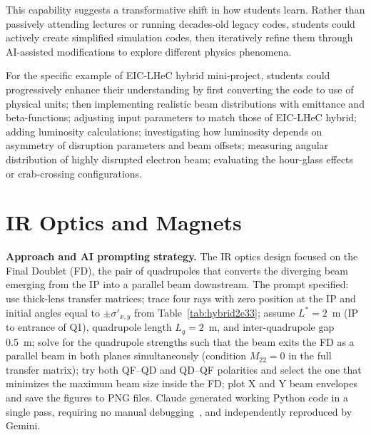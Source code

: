 \documentclass[%
               refpage,       %
               biblatex,     %
               hyphens,      %
               ]{jacow}
\begin{document}
This capability suggests a transformative shift in how students learn. Rather than passively attending lectures or running decades-old legacy codes, students could actively create simplified simulation codes, then iteratively refine them through AI-assisted modifications to explore different physics phenomena.

For the specific example of EIC-LHeC hybrid mini-project, students could progressively enhance their understanding by first converting the code to use of physical units; then implementing realistic beam distributions with emittance and beta-functions; adjusting input parameters to match those of EIC-LHeC hybrid; adding luminosity calculations; investigating how luminosity depends on asymmetry of disruption parameters and beam offsets; measuring angular distribution of highly disrupted electron beam; evaluating the hour-glass effects or crab-crossing configurations. 

\section{IR Optics and Magnets}                                                
   
  \textbf{Approach and AI prompting strategy.}                                   
  The IR optics design focused on the Final Doublet (FD), the pair of
  quadrupoles that converts the diverging beam emerging from the IP into         
  a parallel beam downstream.                               
  The prompt specified: use thick-lens transfer matrices; trace four rays        
  with zero position at the IP and initial angles equal to  
  $\pm\sigma'_{x,y}$ from Table~\ref{tab:hybrid2e33}; assume                     
  $L^{*}=2$~m (IP to entrance of Q1), quadrupole length $L_q=2$~m, and           
  inter-quadrupole gap 0.5~m; solve for the quadrupole strengths such that       
  the beam exits the FD as a parallel beam in both planes simultaneously         
  (condition $M_{22}=0$ in the full transfer matrix); try both QF--QD and
  QD--QF polarities and select the one that minimizes the maximum beam           
  size inside the FD; plot X and Y beam envelopes and save the figures to
  PNG files.                                                                     
  Claude generated working Python code in a single pass, requiring no
  manual debugging~\cite{GitHub}, and independently reproduced by Gemini.                                                
                                                                                 
\end{document}
